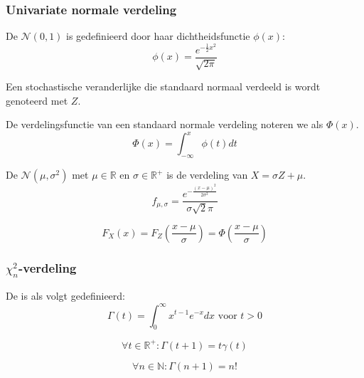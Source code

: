 \documentclass[main.tex]{subfiles}
\begin{document}
\subsubsection{Univariate normale verdeling}
\label{sec:univ-norm-verd}

\begin{de}
  De  $\mathcal{N}(0,1)$ is gedefinieerd door haar dichtheidsfunctie $\phi(x)$:
  \[ \phi(x) = \frac{e^{-\frac{1}{2}x^{2}}}{\sqrt{2\pi}} \]
\end{de}

\begin{de}
  Een stochastische veranderlijke die standaard normaal verdeeld is wordt genoteerd met $Z$.
\end{de}

\begin{de}
  De verdelingsfunctie van een standaard normale verdeling noteren we als $\Phi(x)$.
  \[ \Phi(x) = \int_{-\infty}^{x}\phi(t)dt \]
\end{de}

\begin{de}
  De  $\mathcal{N}(\mu,\sigma^{2})$ met $\mu \in \mathbb{R}$ en $\sigma \in \mathbb{R}^{+}$ is de verdeling van $X = \sigma Z + \mu$.
  \[ f_{\mu, \sigma} = \frac{e^{-\frac{(x-\mu)^{2}}{2\sigma^{2}}}}{\sigma\sqrt{2}\pi} \]
\end{de}

\begin{st}
  \[ F_{X}(x) = F_{Z} \left( \frac{x-\mu}{\sigma} \right) = \Phi\left( \frac{x-\mu}{\sigma} \right) \]
\end{st}

\subsubsection{$\chi_{n}^2$-verdeling}
\label{sec:chi_n2-verdeling}


\begin{de}
  De  is als volgt gedefinieerd:
  \[
  \Gamma(t) = \int_{0}^{\infty}x^{t-1}e^{-x}dx \text{ voor } t > 0
  \]
\end{de}

\begin{st}
  \[ \forall t \in \mathbb{R}^{+}: \Gamma(t+1) = t\gamma(t) \]
\end{st}

\begin{st}
  \[ \forall n \in \mathbb{N}: \Gamma(n+1) = n! \]
\end{st}
\end{document}

